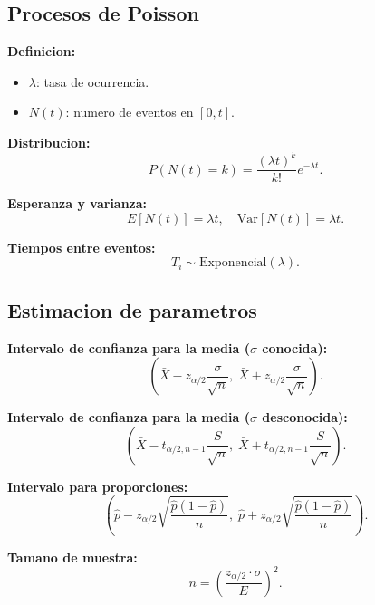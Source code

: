 \documentclass{article}
\begin{document}
\subsection{Procesos de Poisson}

\textbf{Definicion:}
\begin{itemize}
  \item $\lambda$: tasa de ocurrencia.
  \item $N(t)$: numero de eventos en $[0,t]$.
\end{itemize}

\textbf{Distribucion:}
\[
  P(N(t) = k) = \frac{(\lambda t)^k}{k!} e^{-\lambda t}.
\]

\textbf{Esperanza y varianza:}
\[
  E[N(t)] = \lambda t, \quad \text{Var}[N(t)] = \lambda t.
\]

\textbf{Tiempos entre eventos:}
\[
  T_i \sim \text{Exponencial}(\lambda).
\]

\subsection{Estimacion de parametros}

\textbf{Intervalo de confianza para la media ($\sigma$ conocida):}
\[
  \left( \bar{X} - z_{\alpha/2} \frac{\sigma}{\sqrt{n}}, \; \bar{X} + z_{\alpha/2} \frac{\sigma}{\sqrt{n}} \right).
\]

\textbf{Intervalo de confianza para la media ($\sigma$ desconocida):}
\[
  \left( \bar{X} - t_{\alpha/2, n-1} \frac{S}{\sqrt{n}}, \; \bar{X} + t_{\alpha/2, n-1} \frac{S}{\sqrt{n}} \right).
\]

\textbf{Intervalo para proporciones:}
\[
  \left( \hat{p} - z_{\alpha/2} \sqrt{\frac{\hat{p}(1-\hat{p})}{n}}, \; \hat{p} + z_{\alpha/2} \sqrt{\frac{\hat{p}(1-\hat{p})}{n}} \right).
\]

\textbf{Tamano de muestra:}
\[
  n = \left( \frac{z_{\alpha/2} \cdot \sigma}{E} \right)^2.
\]
\end{document}
